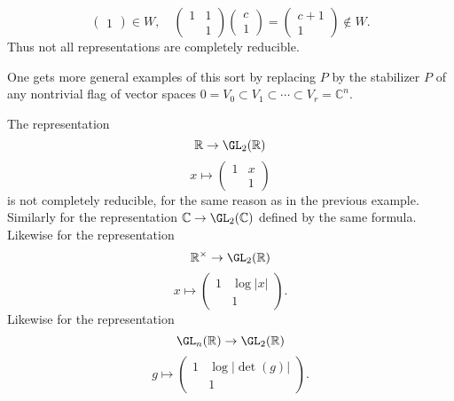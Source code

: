 \documentclass[reqno]{amsart} 
\begin{document}
\begin{example}
\begin{equation*}
\begin{pmatrix}
      1
    \end{pmatrix}
 \in W,
    \quad 
    \begin{pmatrix}
      1 & 1 \\
       & 1
     \end{pmatrix}
    \begin{pmatrix}
      c  \\
      1
    \end{pmatrix}
    = 
\begin{pmatrix}
      c+1  \\
      1      
    \end{pmatrix}
 \notin  W.
  \end{equation*}
  Thus not all representations are completely reducible.

  One gets more general examples of this sort by replacing $P$
  by the stabilizer $P$  of any nontrivial flag of vector spaces
  $0 = V_0 \subset V_1 \subset \dotsb \subset V_r =
  \mathbb{C}^n$.  
\end{example}

\begin{example}\label{boring-examples-of-non-reductivity}
  The representation
  \begin{equation*}
    \mathbb{R} \rightarrow \GL_2(\mathbb{R})
  \end{equation*}
  \begin{equation*}
    x \mapsto 
\begin{pmatrix}
      1 & x \\
       & 1
    \end{pmatrix}
  \end{equation*}
  is not completely reducible,
  for the same reason as in the previous example.
  Similarly for the representation $\mathbb{C}  \rightarrow
  \GL_2(\mathbb{C})$
  defined by the same formula.
  Likewise for the representation
  \begin{equation*}
    \mathbb{R}^\times \rightarrow \GL_2(\mathbb{R})
  \end{equation*}
  \begin{equation*}
    x \mapsto 
\begin{pmatrix}
      1 & \log|x| \\
       & 1
    \end{pmatrix}
.
  \end{equation*}
  Likewise for the representation
  \begin{equation*}
    \GL_n(\mathbb{R}) \rightarrow \GL_2(\mathbb{R})
  \end{equation*}
  \begin{equation*}
    g \mapsto 
\begin{pmatrix}
      1 & \log|\det(g)| \\
       & 1
    \end{pmatrix}
.
  \end{equation*}
\end{example}
\end{document}
